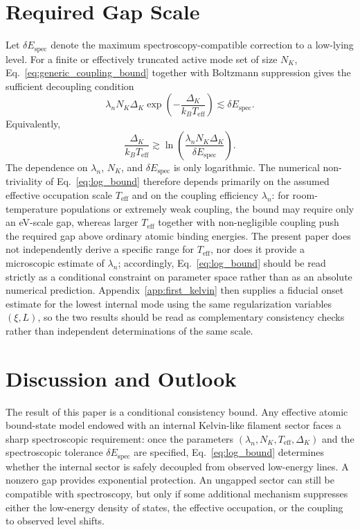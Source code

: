 \documentclass[pdflatex,sn-mathphys-num]{sn-jnl}
\begin{document}
    \section{Required Gap Scale}\label{sec:required_gap}
        Let $\delta E_{\mathrm{spec}}$ denote the maximum spectroscopy-compatible correction to a low-lying level. For a finite or effectively truncated active mode set of size $N_K$, Eq.~\eqref{eq:generic_coupling_bound} together with Boltzmann suppression gives the sufficient decoupling condition
        \begin{equation}
            \lambda_n N_K \Delta_K
            \exp\!\left(-\frac{\Delta_K}{k_B T_{\mathrm{eff}}}\right)
            \lesssim
            \delta E_{\mathrm{spec}}.
            \label{eq:general_bound}
        \end{equation}
        Equivalently,
        \begin{equation}
            \frac{\Delta_K}{k_B T_{\mathrm{eff}}}
            \gtrsim
            \ln\!\left(\frac{\lambda_n N_K \Delta_K}{\delta E_{\mathrm{spec}}}\right).
            \label{eq:log_bound}
        \end{equation}
        The dependence on $\lambda_n$, $N_K$, and $\delta E_{\mathrm{spec}}$ is only logarithmic. The numerical non-triviality of Eq.~\eqref{eq:log_bound} therefore depends primarily on the assumed effective occupation scale $T_{\mathrm{eff}}$ and on the coupling efficiency $\lambda_n$: for room-temperature populations or extremely weak coupling, the bound may require only an eV-scale gap, whereas larger $T_{\mathrm{eff}}$ together with non-negligible coupling push the required gap above ordinary atomic binding energies. The present paper does not independently derive a specific range for $T_{\mathrm{eff}}$, nor does it provide a microscopic estimate of $\lambda_n$; accordingly, Eq.~\eqref{eq:log_bound} should be read strictly as a conditional constraint on parameter space rather than as an absolute numerical prediction. Appendix~\ref{app:first_kelvin} then supplies a fiducial onset estimate for the lowest internal mode using the same regularization variables $(\xi,L)$, so the two results should be read as complementary consistency checks rather than independent determinations of the same scale.

    \section{Discussion and Outlook}\label{sec:outlook}
        The result of this paper is a conditional consistency bound. Any effective atomic bound-state model endowed with an internal Kelvin-like filament sector faces a sharp spectroscopic requirement: once the parameters $(\lambda_n,N_K,T_{\mathrm{eff}},\Delta_K)$ and the spectroscopic tolerance $\delta E_{\mathrm{spec}}$ are specified, Eq.~\eqref{eq:log_bound} determines whether the internal sector is safely decoupled from observed low-energy lines. A nonzero gap provides exponential protection. An ungapped sector can still be compatible with spectroscopy, but only if some additional mechanism suppresses either the low-energy density of states, the effective occupation, or the coupling to observed level shifts.
\end{document}
